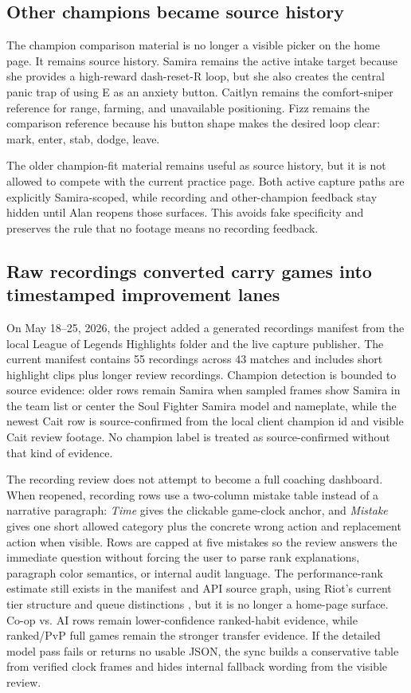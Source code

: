 \documentclass[12pt,letterpaper]{article}
\begin{document}
\subsection{Other champions became source history}

The champion comparison material is no longer a visible picker on the home page. It remains source history. Samira remains the active intake target because she provides a high-reward dash-reset-R loop, but she also creates the central panic trap of using E as an anxiety button. Caitlyn remains the comfort-sniper reference for range, farming, and unavailable positioning. Fizz remains the comparison reference because his button shape makes the desired loop clear: mark, enter, stab, dodge, leave.

The older champion-fit material remains useful as source history, but it is not allowed to compete with the current practice page. Both active capture paths are explicitly Samira-scoped, while recording and other-champion feedback stay hidden until Alan reopens those surfaces. This avoids fake specificity and preserves the rule that no footage means no recording feedback.

\subsection{Raw recordings converted carry games into timestamped improvement lanes}

On May 18--25, 2026, the project added a generated recordings manifest from the local League of Legends Highlights folder and the live capture publisher. The current manifest contains 55 recordings across 43 matches and includes short highlight clips plus longer review recordings. Champion detection is bounded to source evidence: older rows remain Samira when sampled frames show Samira in the team list or center the Soul Fighter Samira model and nameplate, while the newest Cait row is source-confirmed from the local client champion id and visible Cait review footage. No champion label is treated as source-confirmed without that kind of evidence.

The recording review does not attempt to become a full coaching dashboard. When reopened, recording rows use a two-column mistake table instead of a narrative paragraph: \emph{Time} gives the clickable game-clock anchor, and \emph{Mistake} gives one short allowed category plus the concrete wrong action and replacement action when visible. Rows are capped at five mistakes so the review answers the immediate question without forcing the user to parse rank explanations, paragraph color semantics, or internal audit language. The performance-rank estimate still exists in the manifest and API source graph, using Riot's current tier structure and queue distinctions \cite{riotRankedTiers2026,riotApexTiers2026}, but it is no longer a home-page surface. Co-op vs. AI rows remain lower-confidence ranked-habit evidence, while ranked/PvP full games remain the stronger transfer evidence. If the detailed model pass fails or returns no usable JSON, the sync builds a conservative table from verified clock frames and hides internal fallback wording from the visible review.
\end{document}
